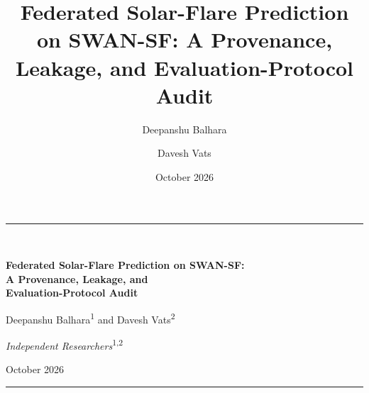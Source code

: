\documentclass[11pt,a4paper]{article}
\title{Federated Solar-Flare Prediction on SWAN-SF: A Provenance,
Leakage, and Evaluation-Protocol Audit}
\author{Deepanshu Balhara \and Davesh Vats}
\date{October 2026}
\begin{document}
\thispagestyle{plain}

\begin{center}
    {\color{black!85}\rule{\textwidth}{0.4pt}}\\[2.2em]
    {\LARGE\bfseries Federated Solar-Flare Prediction on SWAN-SF:\\[0.35em]
     A Provenance, Leakage, and\\[0.15em]
     Evaluation-Protocol Audit\par}
    \vspace{1.6em}
    {\large Deepanshu Balhara\textsuperscript{1} \quad and \quad
     Davesh Vats\textsuperscript{2}\par}
    \vspace{0.7em}
    {\small\textit{Independent Researchers}\textsuperscript{1,2}\par}
    \vspace{1.1em}
    {\small October 2026\par}
    \vspace{1.4em}
    {\color{black!85}\rule{\textwidth}{0.4pt}}
\end{center}

\vspace{0.4em}
\end{document}
